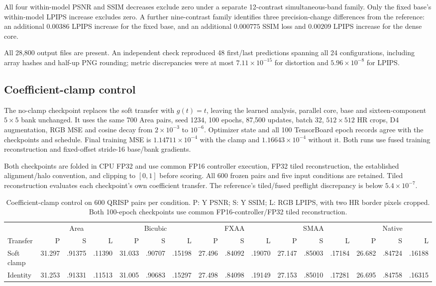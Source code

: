 \documentclass[10pt,twocolumn,letterpaper]{article}
\begin{document}
All four within-model PSNR and SSIM decreases exclude zero under a separate 12-contrast simultaneous-band family.
Only the fixed base's within-model LPIPS increase excludes zero.
A further nine-contrast family identifies three precision-change differences from the reference: an additional $0.00386$ LPIPS increase for the fixed base, and an additional $0.000775$ SSIM loss and $0.00209$ LPIPS increase for the dense core.

All 28,800 output files are present.
An independent check reproduced 48 first/last predictions spanning all 24 configurations, including array hashes and half-up PNG rounding; metric discrepancies were at most $7.11\times10^{-15}$ for distortion and $5.96\times10^{-8}$ for LPIPS.

\subsection{Coefficient-clamp control}
\label{sec:clamp-ablation}
The no-clamp checkpoint replaces the soft transfer with $g(t)=t$, leaving the learned analysis, parallel core, base and sixteen-component $5\times5$ bank unchanged.
It uses the same 700 Area pairs, seed 1234, 100 epochs, 87,500 updates, batch 32, $512\times512$ HR crops, D4 augmentation, RGB MSE and cosine decay from $2\times10^{-3}$ to $10^{-6}$.
Optimizer state and all 100 TensorBoard epoch records agree with the checkpoints and schedule.
Final training MSE is $1.14711\times10^{-4}$ with the clamp and $1.16643\times10^{-4}$ without it.
Both runs use fused training reconstruction and fixed-offset stride-16 base/bank gradients.

Both checkpoints are folded in CPU FP32 and use common FP16 controller execution, FP32 tiled reconstruction, the established alignment/halo convention, and clipping to $[0,1]$ before scoring.
All 600 frozen pairs and five input conditions are retained.
Tiled reconstruction evaluates each checkpoint's own coefficient transfer.
The reference's tiled/fused preflight discrepancy is below $5.4\times10^{-7}$.

\begin{table}[t]
\centering\scriptsize
\setlength{\tabcolsep}{2.5pt}
\caption{Coefficient-clamp control on 600 QRISP pairs per condition. P: Y PSNR; S: Y SSIM; L: RGB LPIPS, with two HR border pixels cropped. Both 100-epoch checkpoints use common FP16-controller/FP32 tiled reconstruction.}
\label{tab:clamp-quality}
\begin{tabular}{l*{15}{r}}
\toprule
 & \multicolumn{3}{c}{Area} & \multicolumn{3}{c}{Bicubic} & \multicolumn{3}{c}{FXAA} & \multicolumn{3}{c}{SMAA} & \multicolumn{3}{c}{Native}\\
Transfer & P & S & L & P & S & L & P & S & L & P & S & L & P & S & L\\
\midrule
Soft clamp &31.297&.91375&.11390&31.033&.90707&.15198&27.496&.84092&.19070&27.147&.85003&.17184&26.682&.84724&.16188\\
Identity &31.253&.91331&.11513&31.005&.90683&.15297&27.498&.84098&.19149&27.153&.85010&.17281&26.695&.84758&.16315\\
\bottomrule
\end{tabular}
\end{table}
\end{document}
